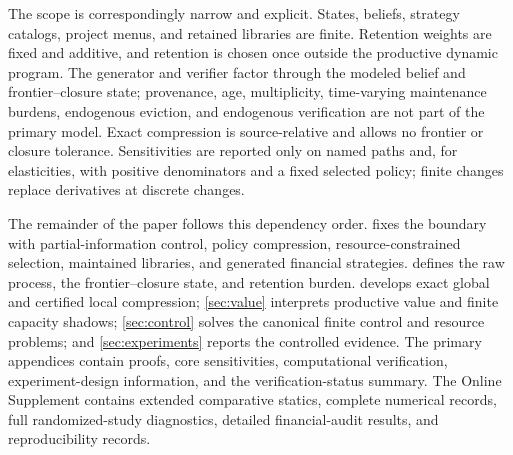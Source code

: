 The scope is correspondingly narrow and explicit. States, beliefs, strategy
catalogs, project menus, and retained libraries are finite. Retention weights
are fixed and additive, and retention is chosen once outside the productive
dynamic program. The generator and verifier factor through the modeled belief
and frontier--closure state; provenance, age, multiplicity, time-varying
maintenance burdens, endogenous eviction, and endogenous verification are not
part of the primary model. Exact compression is source-relative and allows no
frontier or closure tolerance. Sensitivities are reported only on named paths
and, for elasticities, with positive denominators and a fixed selected policy;
finite changes replace derivatives at discrete changes.

The remainder of the paper follows this dependency order.
 fixes the boundary with partial-information
control, policy compression, resource-constrained selection, maintained
libraries, and generated financial strategies.  defines the
raw process, the frontier--closure state, and retention burden.
 develops exact global and certified local compression;
\cref{sec:value} interprets productive value and finite capacity shadows;
\cref{sec:control} solves the canonical finite control and resource problems;
and \cref{sec:experiments} reports the controlled evidence. The primary
appendices contain proofs, core sensitivities, computational verification,
experiment-design information, and the verification-status summary. The
Online Supplement contains extended comparative statics, complete numerical
records, full randomized-study diagnostics, detailed financial-audit results,
and reproducibility records.

\clearpage
